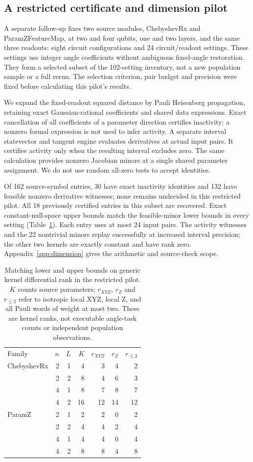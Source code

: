 \subsection{A restricted certificate and dimension pilot}
\label{sec:dimensionpilot}
A separate follow-up fixes two source modules, ChebyshevRx and
ParamZFeatureMap, at two and four qubits, one and two layers, and the
same three readouts: eight circuit configurations and 24 circuit/readout
settings. These settings use integer angle coefficients without
ambiguous fixed-angle restoration. They form a selected subset of the
102-setting inventory, not a new population sample or a full rerun.
The selection criterion, pair budget and precision were fixed before
calculating this pilot's results.

We expand the fixed-readout squared distance by Pauli Heisenberg
propagation, retaining exact Gaussian-rational coefficients and shared
data expressions. Exact cancellation of all coefficients of a parameter
direction certifies inactivity; a nonzero formal expression is not used
to infer activity. A separate interval statevector and tangent engine
evaluates derivatives at actual input pairs. It certifies activity only
when the resulting interval excludes zero. The same calculation provides
nonzero Jacobian minors at a single shared parameter assignment. We do
not use random all-zero tests to accept identities.

Of 162 source-symbol entries, 30 have exact inactivity identities and
132 have feasible nonzero derivative witnesses; none remains undecided
in this restricted pilot. All 18 previously certified entries in this
subset are recovered. Exact constant-null-space upper bounds match
the feasible-minor lower bounds in every setting
(Table~\ref{tab:dimension}). Each entry uses at most 24 input pairs.
The activity witnesses and the 22 nontrivial minors replay successfully
at increased interval precision; the other two kernels are exactly
constant and have rank zero. Appendix~\ref{app:dimension} gives the
arithmetic and source-check scope.

\begin{table}[htbp]
\caption{Matching lower and upper bounds on generic kernel differential
rank in the restricted pilot. $K$ counts source parameters; $r_{XYZ}$,
$r_Z$ and $r_{\le2}$ refer to isotropic local XYZ, local Z, and all Pauli
words of weight at most two. These are kernel ranks, not executable
angle-task counts or independent population observations.}
\label{tab:dimension}
\begin{tabular}{lrrrrrr}
\toprule
Family & $n$ & $L$ & $K$ & $r_{XYZ}$ & $r_Z$ & $r_{\le2}$\\
ChebyshevRx &2&1&4&3&4&2\\
 &2&2&8&4&6&3\\
 &4&1&8&7&8&7\\
 &4&2&16&12&14&12\\
ParamZ &2&1&2&2&0&2\\
 &2&2&4&4&2&4\\
 &4&1&4&4&0&4\\
 &4&2&8&8&4&8\\
\bottomrule
\end{tabular}
\end{table}

